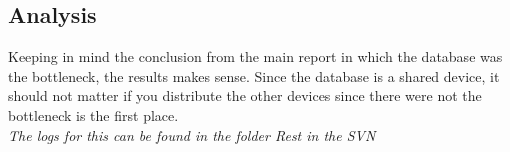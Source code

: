 \documentclass[a4paper, 11pt]{article}
\begin{document}
\subsection{Analysis}
Keeping in mind the conclusion from the main report in which the database was the bottleneck, the results makes sense. Since the database is a shared device, it should not matter if you distribute the other devices since there were not the bottleneck is the first place.\\

\textit{The logs for this can be found in the folder Rest in the SVN}
\end{document}
